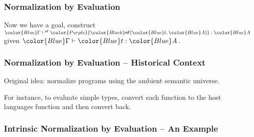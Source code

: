 \documentclass[svgnames]{beamer}
\newcommand\fmttm[1]{{\color{Blue}#1}}
\newcommand\fmtval[1]{{\color{Red}#1}}
\newcommand\fmtnf[1]{{\color{Purple}#1}}
\newcommand{\isterm}[3]{\fmttm{#1}\vdash\fmttm{#2}:\fmttm{#3}}
\newcommand{\isnormal}[3]{\fmttm{#1}\vdash^{\mathsf{nf}}\fmtnf{#2}:\fmttm{#3}}
\newcommand{\nf}[2]{{\color{Black} \mathsf{nf}(\fmttm{#1}, \fmttm{#2})}}
\begin{document}
\begin{frame}
  \frametitle{Normalization by Evaluation}
  \centering
  Now we have a goal, construct $\isnormal{\Gamma}{\nf{t}{A}}{A}$ given $\isterm{\Gamma}{t}{A}$.
\end{frame}
\begin{frame}
  \frametitle{Normalization by Evaluation -- Historical Context}
  \begin{centering}
    Original idea: normalize programs using the ambient semantic universe.
  \end{centering}
  \pause
  \bigskip

  For instance, to evaluate simple types, convert each function to the host languages function and
  then convert back.
\end{frame}

\begin{frame}
  \frametitle{Intrinsic Normalization by Evaluation -- An Example}

\end{frame}

\end{document}
